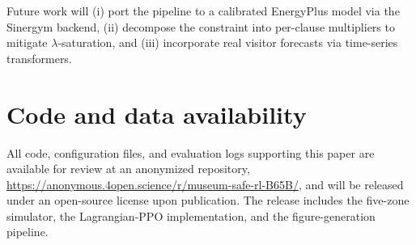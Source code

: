 \documentclass[11pt,a4paper]{article}
\begin{document}
Future work will (i) port the pipeline to a calibrated EnergyPlus
model via the Sinergym backend, (ii) decompose the constraint into
per-clause multipliers to mitigate $\lambda$-saturation, and (iii)
incorporate real visitor forecasts via time-series transformers.


\section*{Code and data availability}

All code, configuration files, and evaluation logs supporting this
paper are available for review at an anonymized repository,
\url{https://anonymous.4open.science/r/museum-safe-rl-B65B/}, and will
be released under an open-source license upon publication. The release
includes the five-zone simulator, the Lagrangian-PPO implementation,
and the figure-generation pipeline.



\end{document}
